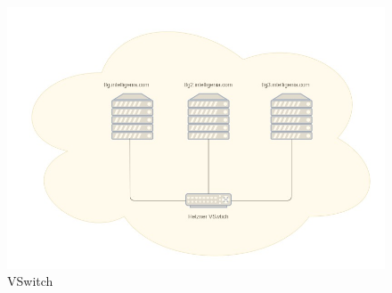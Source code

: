 	\begin{figure}[!hbt]
		\centering
		\includegraphics[scale=0.4]{imagenes/Analisis/vswitch.jpg}
		\caption[VSwitch]{VSwitch}
		\label{VSwitch}
	\end{figure}





	
	
	